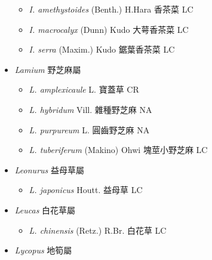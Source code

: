 \begin{itemize}
  \begin{itemize}
        \item[] \textit{I. amethystoides} (Benth.) H.Hara  香茶菜   LC
        \item[] \textit{I. macrocalyx} (Dunn) Kudo  大萼香茶菜   LC
        \item[] \textit{I. serra} (Maxim.) Kudo  鋸葉香茶菜   LC
  \end{itemize}
 \item[] \textit{Lamium} 野芝麻屬
                                
  \begin{itemize}
        \item[] \textit{L. amplexicaule} L.  寶蓋草   CR
        \item[] \textit{L. hybridum} Vill.  雜種野芝麻   NA
        \item[] \textit{L. purpureum} L.  圓齒野芝麻   NA
        \item[] \textit{L. tuberiferum} (Makino) Ohwi  塊莖小野芝麻   LC
  \end{itemize}
 \item[] \textit{Leonurus} 益母草屬
                                
  \begin{itemize}
        \item[] \textit{L. japonicus} Houtt.  益母草   LC
  \end{itemize}
 \item[] \textit{Leucas} 白花草屬
                                
  \begin{itemize}
        \item[] \textit{L. chinensis} (Retz.) R.Br.  白花草   LC
  \end{itemize}
 \item[] \textit{Lycopus} 地筍屬
                                

\end{itemize}
